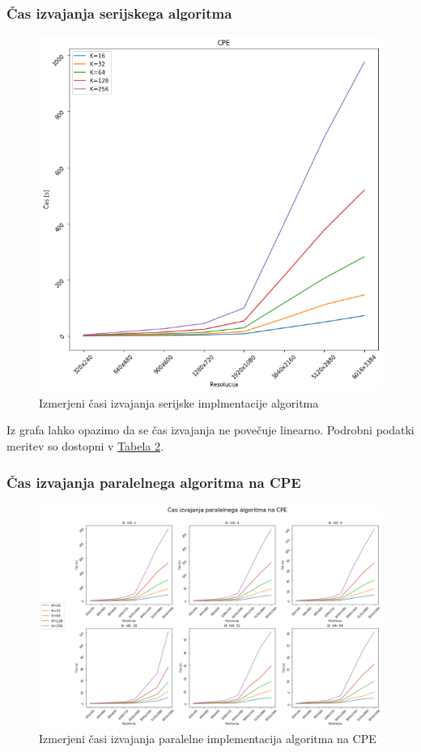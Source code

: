 \documentclass[11pt]{article}
\begin{document}
\subsubsection{Čas izvajanja serijskega algoritma}
\begin{figure}[H]
    \label{img:cpu}
    \centering
    \includegraphics[scale=0.5]{cpu}
    \caption{Izmerjeni časi izvajanja serijske implmentacije algoritma}
\end{figure}
Iz grafa lahko opazimo da se čas izvajanja ne povečuje linearno.
Podrobni podatki meritev so dostopni v \hyperref[dat:cpu]{Tabela 2}.


\subsubsection{Čas izvajanja paralelnega algoritma na CPE}
\begin{figure}[H]
    \label{img:cpup}
    \centering
    \includegraphics[scale=0.3]{cpup}
    \caption{Izmerjeni časi izvajanja paralelne implementacija algoritma na CPE}
\end{figure}
\end{document}
